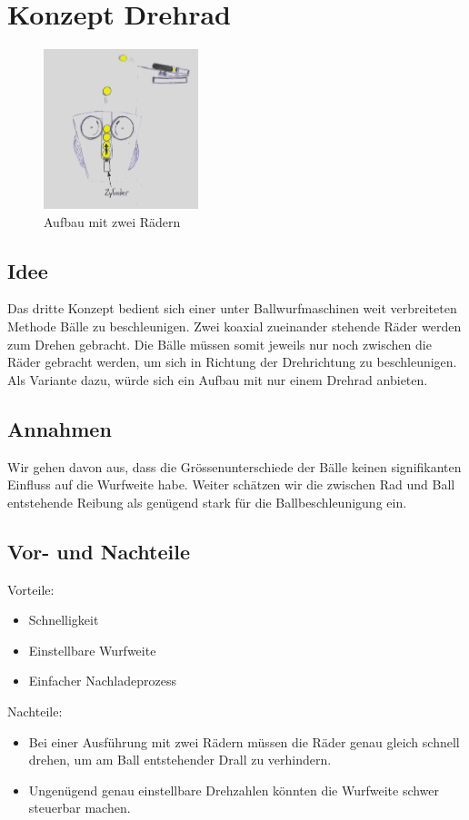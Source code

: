 \section{Konzept Drehrad}
\begin{figure}[h!]
	\centering
	\includegraphics[width=0.4\textwidth]{../../fig/Wurfmaschine_Drehraeder.png}
	\caption{Aufbau mit zwei Rädern}
	\label{fig:drehradmaschine}
\end{figure}

\subsection{Idee}
Das dritte Konzept bedient sich einer unter Ballwurfmaschinen weit verbreiteten Methode Bälle zu beschleunigen. Zwei koaxial zueinander stehende Räder werden zum Drehen gebracht. Die Bälle müssen somit jeweils nur noch zwischen die Räder gebracht werden, um sich in Richtung der Drehrichtung zu beschleunigen. Als Variante dazu, würde sich ein Aufbau mit nur einem Drehrad anbieten.


\subsection{Annahmen}
Wir gehen davon aus,  dass die Grössenunterschiede der Bälle keinen signifikanten Einfluss auf die Wurfweite habe. Weiter schätzen wir die zwischen Rad und Ball entstehende Reibung als genügend stark für die Ballbeschleunigung ein.

\subsection{Vor- und Nachteile}
Vorteile:

\begin{itemize}
	\item Schnelligkeit
	\item Einstellbare Wurfweite
	\item Einfacher Nachladeprozess
\end{itemize}

\noindent Nachteile:

\begin{itemize}
	\item Bei einer Ausführung mit zwei Rädern müssen die Räder genau gleich schnell drehen, um am Ball entstehender Drall zu verhindern.
	\item Ungenügend genau einstellbare Drehzahlen könnten die Wurfweite schwer steuerbar machen. 
\end{itemize}
